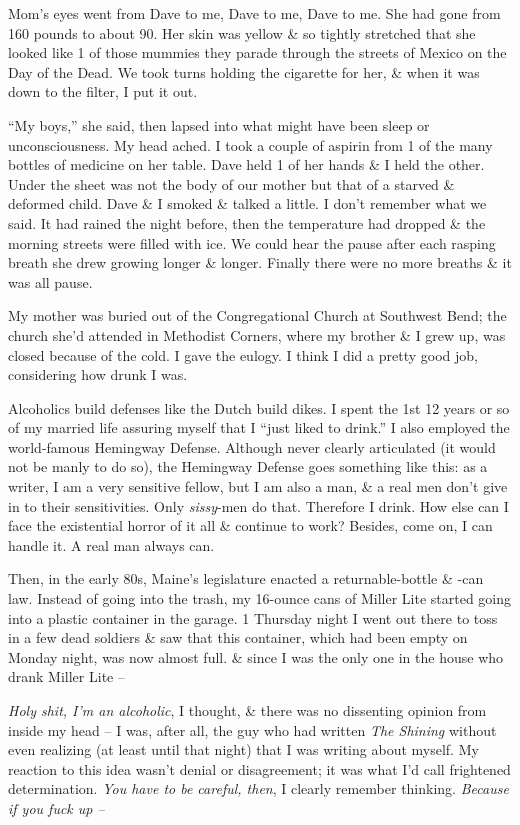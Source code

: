 \documentclass{article}
\numberwithin{equation}{section}
\begin{document}
Mom's eyes went from Dave to me, Dave to me, Dave to me. She had gone from 160 pounds to about 90. Her skin was yellow \& so tightly stretched that she looked like 1 of those mummies they parade through the streets of Mexico on the Day of the Dead. We took turns holding the cigarette for her, \& when it was down to the filter, I put it out.

``My boys,'' she said, then lapsed into what might have been sleep or unconsciousness. My head ached. I took a couple of aspirin from 1 of the many bottles of medicine on her table. Dave held 1 of her hands \& I held the other. Under the sheet was not the body of our mother but that of a starved \& deformed child. Dave \& I smoked \& talked a little. I don't remember what we said. It had rained the night before, then the temperature had dropped \& the morning streets were filled with ice. We could hear the pause after each rasping breath she drew growing longer \& longer. Finally there were no more breaths \& it was all pause.

 My mother was buried out of the Congregational Church at Southwest Bend; the church she'd attended in Methodist Corners, where my brother \& I grew up, was closed because of the cold. I gave the eulogy. I think I did a pretty good job, considering how drunk I was.

 Alcoholics build defenses like the Dutch build dikes. I spent the 1st 12 years or so of my married life assuring myself that I ``just liked to drink.'' I also employed the world-famous Hemingway Defense. Although never clearly articulated (it would not be manly to do so), the Hemingway Defense goes something like this: as a writer, I am a very sensitive fellow, but I am also a man, \& a real men don't give in to their sensitivities. Only \textit{sissy}-men do that. Therefore I drink. How else can I face the existential horror of it all \& continue to work? Besides, come on, I can handle it. A real man always can.

Then, in the early 80s, Maine's legislature enacted a returnable-bottle \& -can law. Instead of going into the trash, my 16-ounce cans of Miller Lite started going into a plastic container in the garage. 1 Thursday night I went out there to toss in a few dead soldiers \& saw that this container, which had been empty on Monday night, was now almost full. \& since I was the only one in the house who drank Miller Lite --

\textit{Holy shit, I'm an alcoholic}, I thought, \& there was no dissenting opinion from inside my head -- I was, after all, the guy who had written \textit{The Shining} without even realizing (at least until that night) that I was writing about myself. My reaction to this idea wasn't denial or disagreement; it was what I'd call frightened determination. \textit{You have to be careful, then}, I clearly remember thinking. \textit{Because if you fuck up --}
\end{document}
